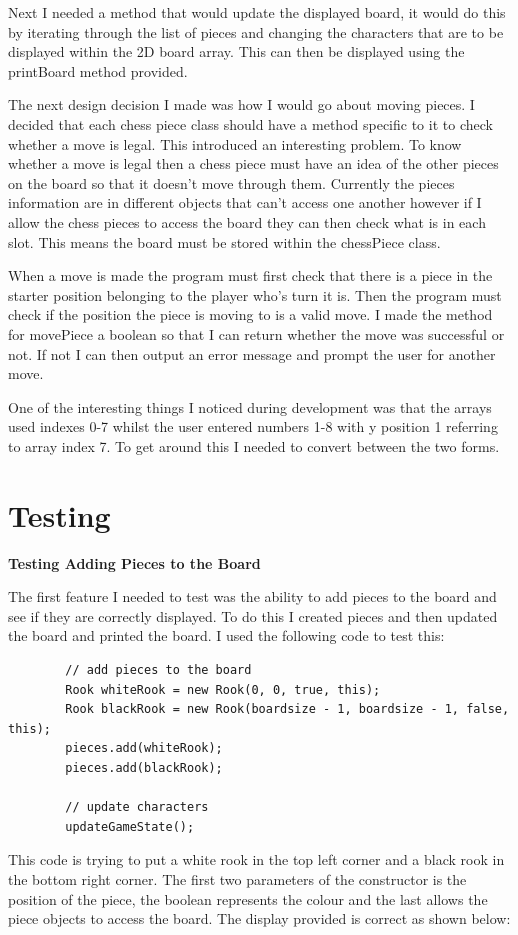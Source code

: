 \documentclass[a4paper]{article}
\begin{document}
Next I needed a method that would update the displayed board, it would do this by iterating through the list of pieces and changing the characters that are to be displayed within the 2D board array. This can then be displayed using the printBoard method provided.

The next design decision I made was how I would go about moving pieces. I decided that each chess piece class should have a method specific to it to check whether a move is legal. This introduced an interesting problem. To know whether a move is legal then a chess piece must have an idea of the other pieces on the board so that it doesn't move through them. Currently the pieces information are in different objects that can't access one another however if I allow the chess pieces to access the board they can then check what is in each slot. This means the board must be stored within the chessPiece class.

When a move is made the program must first check that there is a piece in the starter position belonging to the player who's turn it is. Then the program must check if the position the piece is moving to is a valid move. I made the method for movePiece a boolean so that I can return whether the move was successful or not. If not I can then output an error message and prompt the user for another move.

One of the interesting things I noticed during development was that the arrays used indexes 0-7 whilst the user entered numbers 1-8 with y position 1 referring to array index 7. To get around this I needed to convert between the two forms.

\section*{Testing}
\noindent \textbf{Testing Adding Pieces to the Board}

The first feature I needed to test was the ability to add pieces to the board and see if they are correctly displayed. To do this I created pieces and then updated the board and printed the board. I used the following code to test this: \begin{lstlisting}
		// add pieces to the board
        Rook whiteRook = new Rook(0, 0, true, this);
        Rook blackRook = new Rook(boardsize - 1, boardsize - 1, false, this);
        pieces.add(whiteRook);
        pieces.add(blackRook);

        // update characters
        updateGameState();
\end{lstlisting}
This code is trying to put a white rook in the top left corner and a black rook in the bottom right corner. The first two parameters of the constructor is the position of the piece, the boolean represents the colour and the last allows the piece objects to access the board. The display provided is correct as shown below:
\end{document}
